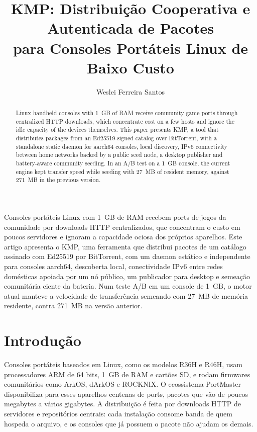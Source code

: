 \documentclass[12pt]{article}
\title{KMP: Distribuição Cooperativa e Autenticada de Pacotes\\
       para Consoles Portáteis Linux de Baixo Custo}
\author{Weslei Ferreira Santos\inst{1}}
\begin{document}
\maketitle

\begin{abstract}
  Linux handheld consoles with 1~GB of RAM receive community game ports
  through centralized HTTP downloads, which concentrate cost on a few hosts and
  ignore the idle capacity of the devices themselves. This paper presents
  KMP, a tool that distributes packages from an Ed25519-signed catalog over
  BitTorrent, with a standalone static daemon for aarch64 consoles, local
  discovery, IPv6 connectivity between home networks backed by a public seed
  node, a desktop publisher and battery-aware community seeding. In an A/B test on a
  1~GB console, the current engine kept transfer speed while seeding with
  27~MB of resident memory, against 271~MB in the previous version.
\end{abstract}

\begin{resumo}
  Consoles portáteis Linux com 1~GB de RAM recebem ports de jogos da
  comunidade por downloads HTTP centralizados, que concentram o custo em poucos
  servidores e ignoram a capacidade ociosa dos próprios aparelhos. Este artigo
  apresenta o KMP, uma ferramenta que distribui pacotes de um catálogo assinado
  com Ed25519 por BitTorrent, com um daemon estático e independente para
  consoles aarch64, descoberta local, conectividade IPv6 entre redes
  domésticas apoiada por um nó público, um publicador para desktop e semeação
  comunitária ciente da bateria. Num teste A/B em um console de 1~GB, o motor atual manteve a
  velocidade de transferência semeando com 27~MB de memória residente, contra
  271~MB na versão anterior.
\end{resumo}

\section{Introdução}
\label{sec:intro}

Consoles portáteis baseados em Linux, como os modelos R36H e R46H, usam
processadores ARM de 64 bits, 1~GB de RAM e cartões SD, e rodam firmwares
comunitários como ArkOS, dArkOS e ROCKNIX. O ecossistema
PortMaster~\cite{portmaster} disponibiliza para esses aparelhos centenas de
ports, pacotes que vão de poucos megabytes a vários gigabytes. A distribuição é
feita por downloads HTTP de servidores e repositórios centrais: cada
instalação consome banda de quem hospeda o arquivo, e os consoles que já
possuem o pacote não ajudam os demais.
\end{document}
